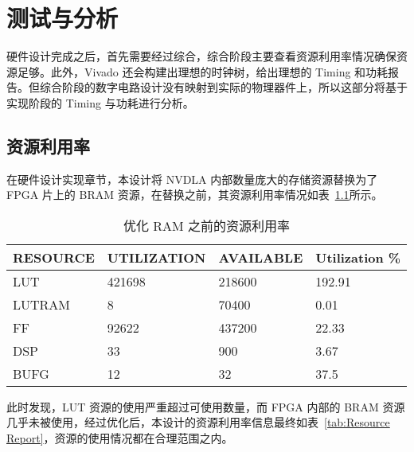 \chapter{测试与分析}\label{chap:result}

硬件设计完成之后，首先需要经过综合，综合阶段主要查看资源利用率情况确保资源足够。此外，Vivado 还会构建出理想的时钟树，给出理想的 Timing 和功耗报告。但综合阶段的数字电路设计没有映射到实际的物理器件上，所以这部分将基于实现阶段的 Timing 与功耗进行分析。

\section{资源利用率}

在硬件设计实现章节，本设计将 NVDLA 内部数量庞大的存储资源替换为了 FPGA 片上的 BRAM 资源，在替换之前，其资源利用率情况如表~\ref{tab:Resource Report Before}所示。

\begin{table}[!htbp]
    \caption{优化 RAM 之前的资源利用率}
    \label{tab:Resource Report Before}
    \centering
    \footnotesize%
    \setlength{\tabcolsep}{4pt}%
    \renewcommand{\arraystretch}{1.2}%
    \begin{tabular}{llll}
        \toprule
        \textbf{RESOURCE} & \textbf{UTILIZATION} & \textbf{AVAILABLE} & \textbf{Utilization \%} \\
        \midrule
        LUT               & 421698               & 218600               & 192.91                  \\
        LUTRAM            & 8                    & 70400                & 0.01                    \\
        FF                & 92622                & 437200               & 22.33                   \\
        DSP               & 33                   & 900                  & 3.67                    \\
        BUFG              & 12                   & 32                   & 37.5                    \\
        \bottomrule                   
    \end{tabular}
\end{table}

此时发现，LUT 资源的使用严重超过可使用数量，而 FPGA 内部的 BRAM 资源几乎未被使用，经过优化后，本设计的资源利用率信息最终如表~\ref{tab:Resource Report}，资源的使用情况都在合理范围之内。

